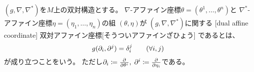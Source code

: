 \documentclass[report]{jlreq}
\begin{document}
\begin{definition}[双対アファイン座標]
    $(g, \nabla, \nabla^*)$を$M$上の双対構造とする。
    $\nabla$-アファイン座標$\theta = (\theta^1, \ldots, \theta^n)$と
    $\nabla^*$-アファイン座標$\eta = (\eta_1, \ldots, \eta_n)$の組
    $(\theta, \eta)$が
    $(g, \nabla, \nabla^*)$に関する
    [dual affine coordinate]
        {双対アファイン座標}[そうついアファインざひょう]
    であるとは、
    \begin{equation}
        g(\partial_i, \partial^j) = \delta_i^j
            \qquad
            (\forall i, j)
    \end{equation}
    が成り立つことをいう。
    ただし$\del_i \coloneqq \deldel{\theta^i}, \;
        \del^i \coloneqq \deldel{\eta_i}$である。
\end{definition}

\begin{definition}[統計的多様体]
    \TODO{}
\end{definition}
\end{document}
